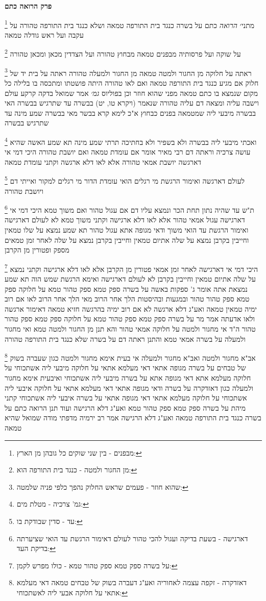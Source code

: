 \documentclass[12pt, openany]{book}
\newcommand{\sethebfont}{
\fontsize{10.5pt}{21.0pt} \selectfont
}
\newcommand{\twocol}[1]{
	{\sethebfont \begin{multicols}{2}
			#1
	\end{multicols}}	
}
\newcommand{\chapname}{}
\newcommand{\newchap}[1]{
	\addcontentsline{toc}{chapter}{#1}
	\renewcommand{\chapname}{#1}
		\begin{center}
			\textbf{%
\fontsize{16pt}{16pt}\selectfont
				#1}
		\end{center}
}
\newcommand{\footnotecomment}[1]{
	\renewcommand\thefootnote{}
	\footnote{#1}}
\newcommand{\commenta}[1]{\footnotecomment{#1}}
\begin{document}
\newchap{פרק  הרואה כתם}
\twocol{
\commenta{מבפנים - בין שני שוקים כל גובהן מן הארץ:}
מתני׳ {\large\emph{הרואה}} כתם על בשרה כנגד בית התורפה טמאה ושלא כנגד בית התורפה טהורה על עקבה ועל ראש גודלה טמאה
\commenta{מן החגור ולמטה - כנגד בית התורפה הוא:}
על שוקה ועל פרסותיה מבפנים טמאה מבחוץ טהורה ועל הצדדין מכאן ומכאן טהורה 
\commenta{שהוא חוזר - פעמים שראש החלוק נהפך כלפי פניה שלמטה:}
ראתה על חלוקה מן החגור ולמטה טמאה מן החגור ולמעלה טהורה ראתה על בית יד של חלוק אם מגיע כנגד בית התורפה טמאה ואם לאו טהורה 
היתה פושטתו ומתכסה בו בלילה כל מקום שנמצא בו כתם טמאה מפני שהוא חוזר וכן בפוליוס
{\large\emph{גמ׳}} אמר שמואל בדקה קרקע עולם וישבה עליה ומצאה דם עליה טהורה שנאמר (ויקרא טו, יט) בבשרה עד שתרגיש בבשרה 
האי בבשרה מיבעי ליה שמטמאה בפנים כבחוץ א"כ לימא קרא בבשר מאי בבשרה שמע מינה עד שתרגיש בבשרה 
\commenta{גמ' צרכיה - מטלת מים:}
ואכתי מיבעי ליה בבשרה ולא בשפיר ולא בחתיכה תרתי שמע מינה 
תא שמע האשה שהיא עושה צרכיה וראתה דם רבי מאיר אומר אם עומדת טמאה ואם יושבת טהורה 
היכי דמי אי דארגשה יושבת אמאי טהורה אלא לאו דלא ארגשה וקתני עומדת טמאה 
\commenta{עד - סדין שבודקת בו:}
לעולם דארגשה ואימור הרגשת מי רגלים הואי עומדת הדור מי רגלים למקור ואייתי דם ויושבת טהורה 
\commenta{דארגישה - בשעת בדיקה ועגול להכי טהור לעולם דאימור הרגשת עד הואי שציערתה בדיקת העד:}
ת"ש עד שהיה נתון תחת הכר ונמצא עליו דם אם עגול טהור ואם משוך טמא 
היכי דמי אי דארגישה עגול אמאי טהור אלא לאו דלא ארגישה וקתני משוך טמא 
לא לעולם דארגישה ואימור הרגשת עד הואי משוך ודאי מגופה אתא עגול טהור 
תא שמע נמצא על שלו טמאין וחייבין בקרבן נמצא על שלה אתיום טמאין וחייבין בקרבן נמצא על שלה לאחר זמן טמאים מספק ופטורין מן הקרבן 
\commenta{על בשרה ספק טמא ספק טהור טמא - כולו מפרש לקמן:}
היכי דמי אי דארגישה לאחר זמן אמאי פטורין מן הקרבן אלא לאו דלא ארגישה וקתני נמצא על שלה אתיום טמאין וחייבין בקרבן לא לעולם דארגישה ואימא הרגשת שמש הוה 
תא שמע נמצאת אתה אומר ג' ספקות באשה על בשרה ספק טמא ספק טהור טמא על חלוקה ספק טמא ספק טהור טהור ובמגעות ובהיסטות הלך אחר הרוב 
מאי הלך אחר הרוב לאו אם רוב ימיה טמאין טמאה ואע"ג דלא ארגשה 
לא אם רוב ימיה בהרגשה חזיא טמאה דאימור ארגשה ולאו אדעתה 
אמר מר על בשרה ספק טמא ספק טהור טמא על חלוקה ספק טמא ספק טהור טהור 
ה"ד אי מחגור ולמטה על חלוקה אמאי טהור והא תנן מן החגור ולמטה טמא ואי מחגור ולמעלה על בשרה אמאי טמא והתנן ראתה דם על בשרה שלא כנגד בית התורפה טהורה 
\commenta{דאזדקרה - זקפה עצמה לאחוריה ואע"ג דעברה בשוק של טבחים טמאה דאי מעלמא אתאי על חלוקה אבעי ליה לאשתכוחי:}
אב"א מחגור ולמטה ואב"א מחגור ולמעלה אי בעית אימא מחגור ולמטה כגון שעברה בשוק של טבחים על בשרה מגופה אתאי דאי מעלמא אתאי על חלוקה מיבעי ליה אשתכוחי על חלוקה מעלמא אתא דאי מגופה אתא על בשרה מיבעי ליה אשתכוחי 
ואיבעית אימא מחגור ולמעלה כגון דאזדקרה על בשרה ודאי מגופה אתאי דאי מעלמא אתאי על חלוקה איבעי ליה אשתכוחי על חלוקה מעלמא אתאי דאי מגופה אתאי על בשרה איבעי ליה אשתכוחי 
קתני מיהת על בשרה ספק טמא ספק טהור טמא ואע"ג דלא הרגישה ועוד תנן הרואה כתם על בשרה כנגד בית התורפה טמאה ואע"ג דלא הרגישה אמר רב ירמיה מדפתי מודה שמואל שהיא טמאה}
\end{document}
